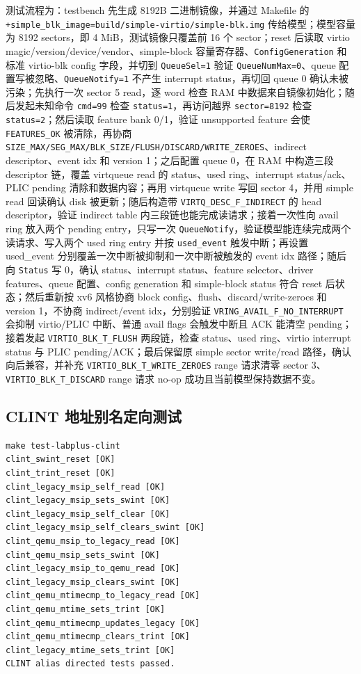 \documentclass[UTF8,a4paper,11pt]{ctexart}
\begin{document}
测试流程为：testbench 先生成 8192B 二进制镜像，并通过 Makefile 的 \texttt{+simple\_blk\_image=build/simple-virtio/simple-blk.img} 传给模型；模型容量为 8192 sectors，即 4 MiB，测试镜像只覆盖前 16 个 sector；reset 后读取 virtio magic/version/device/vendor、simple-block 容量寄存器、\texttt{ConfigGeneration} 和标准 virtio-blk config 字段，并切到 \texttt{QueueSel=1} 验证 \texttt{QueueNumMax=0}、queue 配置写被忽略、\texttt{QueueNotify=1} 不产生 interrupt status，再切回 queue 0 确认未被污染；先执行一次 sector 5 read，逐 word 检查 RAM 中数据来自镜像初始化；随后发起未知命令 \texttt{cmd=99} 检查 \texttt{status=1}，再访问越界 \texttt{sector=8192} 检查 \texttt{status=2}；然后读取 feature bank 0/1，验证 unsupported feature 会使 \texttt{FEATURES\_OK} 被清除，再协商 \texttt{SIZE\_MAX/SEG\_MAX/BLK\_SIZE/FLUSH/DISCARD/WRITE\_ZEROES}、indirect descriptor、event idx 和 version 1；之后配置 queue 0，在 RAM 中构造三段 descriptor 链，覆盖 virtqueue read 的 status、used ring、interrupt status/ack、PLIC pending 清除和数据内容；再用 virtqueue write 写回 sector 4，并用 simple read 回读确认 disk 被更新；随后构造带 \texttt{VIRTQ\_DESC\_F\_INDIRECT} 的 head descriptor，验证 indirect table 内三段链也能完成读请求；接着一次性向 avail ring 放入两个 pending entry，只写一次 \texttt{QueueNotify}，验证模型能连续完成两个读请求、写入两个 used ring entry 并按 \texttt{used\_event} 触发中断；再设置 used\_event 分别覆盖一次中断被抑制和一次中断被触发的 event idx 路径；随后向 \texttt{Status} 写 0，确认 status、interrupt status、feature selector、driver features、queue 配置、config generation 和 simple-block status 符合 reset 后状态；然后重新按 xv6 风格协商 block config、flush、discard/write-zeroes 和 version 1，不协商 indirect/event idx，分别验证 \texttt{VRING\_AVAIL\_F\_NO\_INTERRUPT} 会抑制 virtio/PLIC 中断、普通 avail flags 会触发中断且 ACK 能清空 pending；接着发起 \texttt{VIRTIO\_BLK\_T\_FLUSH} 两段链，检查 status、used ring、virtio interrupt status 与 PLIC pending/ACK；最后保留原 simple sector write/read 路径，确认向后兼容，并补充 \texttt{VIRTIO\_BLK\_T\_WRITE\_ZEROES} range 请求清零 sector 3、\texttt{VIRTIO\_BLK\_T\_DISCARD} range 请求 no-op 成功且当前模型保持数据不变。

\subsection{CLINT 地址别名定向测试}

\begin{Verbatim}[fontsize=\small]
make test-labplus-clint
clint_swint_reset [OK]
clint_trint_reset [OK]
clint_legacy_msip_self_read [OK]
clint_legacy_msip_sets_swint [OK]
clint_legacy_msip_self_clear [OK]
clint_legacy_msip_self_clears_swint [OK]
clint_qemu_msip_to_legacy_read [OK]
clint_qemu_msip_sets_swint [OK]
clint_legacy_msip_to_qemu_read [OK]
clint_legacy_msip_clears_swint [OK]
clint_qemu_mtimecmp_to_legacy_read [OK]
clint_qemu_mtime_sets_trint [OK]
clint_qemu_mtimecmp_updates_legacy [OK]
clint_qemu_mtimecmp_clears_trint [OK]
clint_legacy_mtime_sets_trint [OK]
CLINT alias directed tests passed.
\end{Verbatim}
\end{document}
